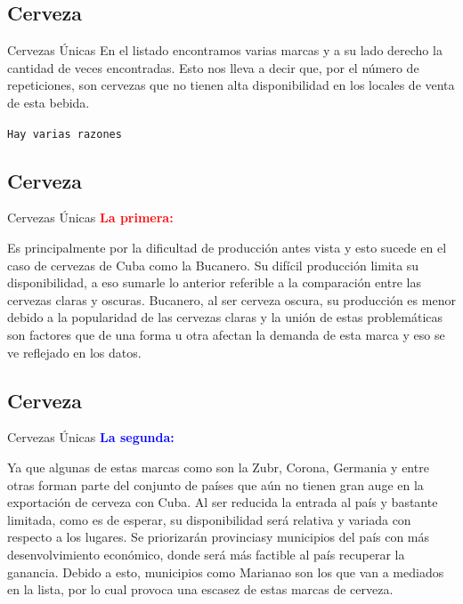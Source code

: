 \subsection{Cerveza}
\begin{frame}[fragile]{Cervezas Únicas}
  En el listado encontramos varias marcas y a su lado derecho la cantidad de veces encontradas. 
  Esto nos lleva a decir que, por el número de repeticiones, son cervezas que no tienen alta disponibilidad en los locales de venta de esta bebida.
  \begin{center}
    \texttt{\Large Hay varias razones}
  \end{center}
\end{frame}

\subsection{Cerveza}
\begin{frame}[fragile]{Cervezas Únicas}
  \textbf{\Large\textcolor{red}{La primera:}}

  Es principalmente por la dificultad de producción antes vista y esto sucede en el caso de cervezas de Cuba como la Bucanero. 
  Su difícil producción limita su disponibilidad, a eso sumarle lo anterior referible a la comparación entre las cervezas claras y oscuras. 
  Bucanero, al ser cerveza oscura, su producción es menor debido a la popularidad de las cervezas claras y la unión de estas problemáticas son factores que de una forma u otra afectan la demanda de esta marca y eso se ve reflejado en los datos.

\end{frame}

\subsection{Cerveza}
\begin{frame}[fragile]{Cervezas Únicas}
  \textbf{\Large\textcolor{blue}{La segunda:}}

  Ya que algunas de estas marcas como son la Zubr, Corona, Germania y entre otras forman parte del conjunto de países que aún no tienen gran auge en la exportación de cerveza con Cuba. 
  Al ser reducida la entrada al país y bastante limitada, como es de esperar, su disponibilidad será relativa y variada con respecto a los lugares. 
  Se priorizarán provinciasy municipios del país con más desenvolvimiento económico, donde será más factible al país recuperar la ganancia. 
  Debido a esto, municipios como Marianao son los que van a mediados en la lista, por lo cual provoca una escasez de estas marcas de cerveza.

\end{frame}  

